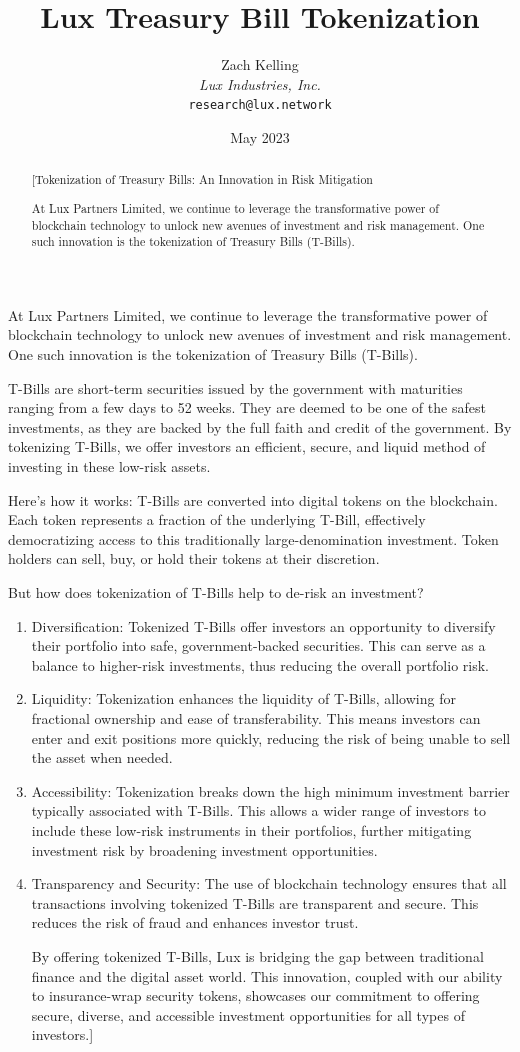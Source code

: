 \documentclass[11pt]{article}
\title{Lux Treasury Bill Tokenization}
\author{Zach Kelling\\\textit{Lux Industries, Inc.}\\\texttt{research@lux.network}}
\date{May 2023}
\begin{document}
\luxcoverpage

\begin{abstract}
[Tokenization of Treasury Bills: An Innovation in Risk Mitigation

At Lux Partners Limited, we continue to leverage the transformative power of blockchain technology to unlock new avenues of investment and risk management. One such innovation is the tokenization of Treasury Bills (T-Bills).
\end{abstract}

\tableofcontents
\newpage


At Lux Partners Limited, we continue to leverage the transformative power of blockchain technology to unlock new avenues of investment and risk management. One such innovation is the tokenization of Treasury Bills (T-Bills).


T-Bills are short-term securities issued by the government with maturities ranging from a few days to 52 weeks. They are deemed to be one of the safest investments, as they are backed by the full faith and credit of the government. By tokenizing T-Bills, we offer investors an efficient, secure, and liquid method of investing in these low-risk assets.


Here's how it works: T-Bills are converted into digital tokens on the blockchain. Each token represents a fraction of the underlying T-Bill, effectively democratizing access to this traditionally large-denomination investment. Token holders can sell, buy, or hold their tokens at their discretion.


But how does tokenization of T-Bills help to de-risk an investment?

\begin{enumerate}
  \item Diversification: Tokenized T-Bills offer investors an opportunity to diversify their portfolio into safe, government-backed securities. This can serve as a balance to higher-risk investments, thus reducing the overall portfolio risk.
  \item Liquidity: Tokenization enhances the liquidity of T-Bills, allowing for fractional ownership and ease of transferability. This means investors can enter and exit positions more quickly, reducing the risk of being unable to sell the asset when needed.
  \item Accessibility: Tokenization breaks down the high minimum investment barrier typically associated with T-Bills. This allows a wider range of investors to include these low-risk instruments in their portfolios, further mitigating investment risk by broadening investment opportunities.
  \item Transparency and Security: The use of blockchain technology ensures that all transactions involving tokenized T-Bills are transparent and secure. This reduces the risk of fraud and enhances investor trust.

By offering tokenized T-Bills, Lux is bridging the gap between traditional finance and the digital asset world. This innovation, coupled with our ability to insurance-wrap security tokens, showcases our commitment to offering secure, diverse, and accessible investment opportunities for all types of investors.]

\end{enumerate}
\end{document}
